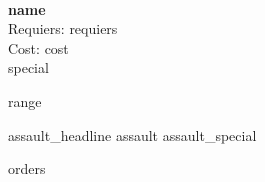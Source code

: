 \ \\
{{\bf {name} }} \\

Requiers: {requiers} \\
Cost: {cost} \\
{special}

{range}

{assault_headline}
{assault}
{assault_special}

{orders}
